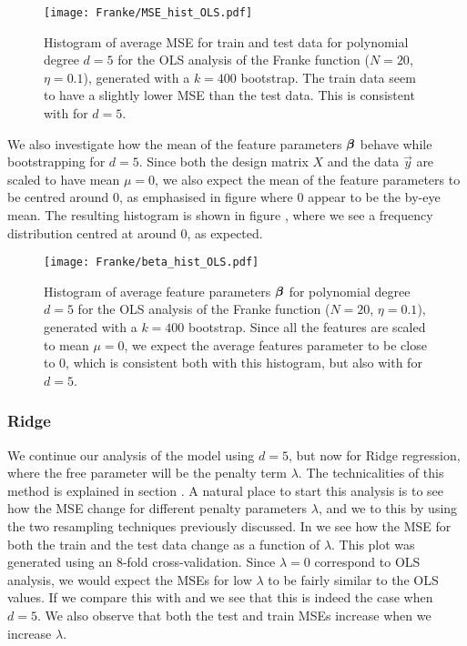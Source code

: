             \begin{figure}
                \texttt{[image: Franke/MSE\_hist\_OLS.pdf]}
                \caption{Histogram of average MSE for train and test data for polynomial degree $d=5$ for the OLS analysis of the Franke function ($N=20$, $\eta=0.1$), generated with a $k=400$ bootstrap. The train data seem to have a slightly lower MSE than the test data. This is consistent with  for $d=5$.}
                \label{fig:mse_hist_ols}
            \end{figure}

            We also investigate how the mean of the feature parameters $\boldsymbol{\beta}$ behave while bootstrapping for $d=5$. Since both the design matrix $X$ and the data $\vec{y}$ are scaled to have mean $\mu=0$, we also expect the mean of the feature parameters to be centred around 0, as emphasised in figure  where 0 appear to be the by-eye mean.  The resulting histogram is shown in figure , where we see a frequency distribution centred at around 0, as expected. 

            \begin{figure}
                \texttt{[image: Franke/beta\_hist\_OLS.pdf]}
                \caption{Histogram of average feature parameters $\boldsymbol{\beta}$ for polynomial degree $d=5$ for the OLS analysis of the Franke function ($N=20$, $\eta=0.1$), generated with a $k=400$ bootstrap. Since all the features are scaled to mean $\mu=0$, we expect the average features parameter to be close to 0, which is consistent both with this histogram, but also with  for $d=5$. }
                \label{fig:beta_hist_ols}
            \end{figure}
            


        

        \subsubsection{Ridge}\label{sec:rigdeanalysis}

        We continue our analysis of the model using $d=5$, but now for Ridge regression, where the free parameter will be the penalty term $\lambda$. The technicalities of this method is explained in section . A natural place to start this analysis is to see how the MSE change for different penalty parameters $\lambda$, and we to this by using the two resampling techniques previously discussed. In  we see how the MSE for both the train and the test data change as a function of $\lambda$. This plot was generated using an 8-fold cross-validation. Since $\lambda=0$ correspond to OLS analysis, we would expect the MSEs for low $\lambda$ to be fairly similar to the OLS values. If we compare this with  and  we see that this is indeed the case when $d=5$. We also observe that both the test and train MSEs increase when we increase $\lambda$. 

